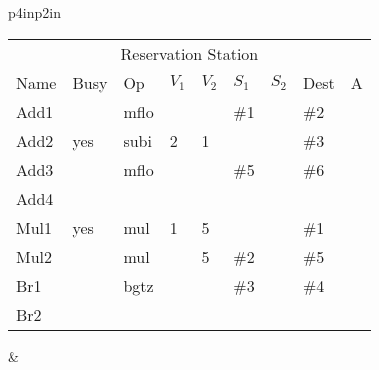 \begin{tabular}{p{4in}p{2in}}
\noindent
\begin{tabular}{lllllllll}
\multicolumn{9}{c}{Reservation Station} \\
Name & Busy & Op   & $V_1$ & $V_2$ & $S_1$ & $S_2$ & Dest & A \\ \hline
Add1 &      & mflo &       &       & \#1   &       & \#2  &   \\
Add2 & yes  & subi & 2     & 1     &       &       & \#3  &   \\
Add3 &      & mflo &       &       & \#5   &       & \#6  &   \\
Add4 &      &      &       &       &       &       &      &   \\ \hline
Mul1 & yes  & mul  & 1     & 5     &       &       & \#1  &   \\
Mul2 &      & mul  &       & 5     & \#2   &       & \#5  &   \\ \hline
Br1  &      & bgtz &       &       & \#3   &       & \#4  &   \\
Br2  &      &      &       &       &       &       &      &   \\
\end{tabular} &  \\
\end{tabular}






